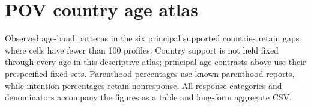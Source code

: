 \section{POV country age atlas}
Observed age-band patterns in the six principal supported countries retain gaps where cells have fewer than 100 profiles. Country support is not held fixed through every age in this descriptive atlas; principal age contrasts above use their prespecified fixed sets. Parenthood percentages use known parenthood reports, while intention percentages retain nonresponse. All response categories and denominators accompany the figures as a table and long-form aggregate CSV.

